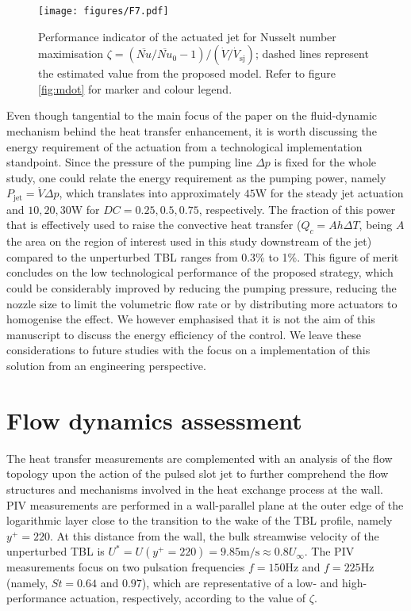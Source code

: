 \begin{figure}[] %
    \centering
    \texttt{[image: figures/F7.pdf]}
    \caption{Performance indicator of the actuated jet for Nusselt number maximisation $\zeta = (\overline{Nu}/\overline{Nu}_0 -1) / (\dot{V}/\dot{V}_{\mathrm{sj}})$; dashed lines  represent the estimated value from the proposed model. Refer to figure \ref{fig:mdot} for marker and colour legend.}
    \label{fig:eta}
\end{figure}

Even though tangential to the main focus of the paper on the fluid-dynamic mechanism behind the heat transfer enhancement, it is worth discussing the energy requirement of the actuation from a technological implementation standpoint. Since the pressure of the pumping line $\Delta p$ is fixed for the whole study, one could relate the energy requirement as the pumping power, namely $P_{\mathrm{jet}} = \dot{V}\Delta p$, which translates into approximately $45\mathrm{W}$ for the steady jet actuation and $10, 20, 30 \mathrm{W}$ for $DC = 0.25,0.5,0.75$, respectively. The fraction of this power that is effectively used to raise the convective heat transfer ($Q_{c} = A h \Delta T$, being $A$ the area on the region of interest used in this study downstream of the jet) compared to the unperturbed TBL ranges from 0.3\% to 1\%. This figure of merit concludes on the low technological performance of the proposed strategy, which could be considerably improved by reducing the pumping pressure, reducing the nozzle size to limit the volumetric flow rate or by distributing more actuators to homogenise the effect. We however emphasised that it is not the aim of this manuscript to discuss the energy efficiency of the control. We leave these considerations to future studies with the focus on a implementation of this solution from an engineering perspective.

%
\section{Flow dynamics assessment}\label{s:pivresults}
%
The heat transfer measurements are complemented with an analysis of the flow topology upon the action of the pulsed slot jet to further comprehend the flow structures and mechanisms involved in the heat exchange process at the wall. PIV measurements are performed in a wall-parallel plane at the outer edge of the logarithmic layer close to the transition to the wake of the TBL profile, namely $y^+=220$. At this distance from the wall, the bulk streamwise velocity of the unperturbed TBL is $U^* = U(y^+ = 220) = 9.85\mathrm{m/s} \approx 0.8U_\infty$. The PIV measurements focus on two pulsation frequencies $f = 150\mathrm{Hz}$ and $f = 225\mathrm{Hz}$ (namely, $St = 0.64$ and $0.97$), which are representative of a low- and high-performance actuation, respectively, according to the value of $\zeta$. 


